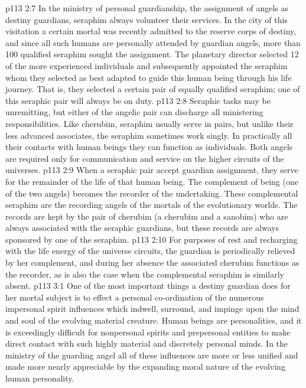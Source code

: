 \vs p113 2:7 \pc In the ministry of personal guardianship, the assignment of angels as destiny guardians, seraphim always volunteer their services. In the city of this visitation a certain mortal was recently admitted to the reserve corps of destiny, and since all such humans are personally attended by guardian angels, more than 100 qualified seraphim sought the assignment. The planetary director selected 12 of the more experienced individuals and subsequently appointed the seraphim whom they selected as best adapted to guide this human being through his life journey. That is, they selected a certain pair of equally qualified seraphim; one of this seraphic pair will always be on duty.
\vs p113 2:8 Seraphic tasks may be unremitting, but either of the angelic pair can discharge all ministering responsibilities. Like cherubim, seraphim usually serve in pairs, but unlike their less advanced associates, the seraphim sometimes work singly. In practically all their contacts with human beings they can function as individuals. Both angels are required only for communication and service on the higher circuits of the universes.
\vs p113 2:9 When a seraphic pair accept guardian assignment, they serve for the remainder of the life of that human being. The complement of being (one of the two angels) becomes the recorder of the undertaking. These complemental seraphim are the recording angels of the mortals of the evolutionary worlds. The records are kept by the pair of cherubim (a cherubim and a sanobim) who are always associated with the seraphic guardians, but these records are always sponsored by one of the seraphim.
\vs p113 2:10 For purposes of rest and recharging with the life energy of the universe circuits, the guardian is periodically relieved by her complement, and during her absence the associated cherubim functions as the recorder, as is also the case when the complemental seraphim is similarly absent.
\vs p113 3:1 One of the most important things a destiny guardian does for her mortal subject is to effect a personal co\hyp{}ordination of the numerous impersonal spirit influences which indwell, surround, and impinge upon the mind and soul of the evolving material creature. Human beings are personalities, and it is exceedingly difficult for nonpersonal spirits and prepersonal entities to make direct contact with such highly material and discretely personal minds. In the ministry of the guarding angel all of these influences are more or less unified and made more nearly appreciable by the expanding moral nature of the evolving human personality.
